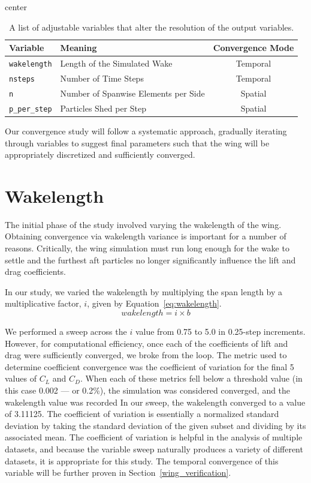 \documentclass{report}
\begin{document}
\begin{table}[H]
    \centering
    \caption{A list of adjustable variables that alter the resolution of the output variables.}\label{tab:adjustables}
    \begin{adjustbox}{center}
    \begin{tabular}{l l c}
        \toprule
        \textbf{Variable} & \textbf{Meaning} & \textbf{Convergence Mode} \\
        \midrule
        \texttt{wakelength} & Length of the Simulated Wake & Temporal \\
        \texttt{nsteps} & Number of Time Steps & Temporal \\
        \texttt{n} & Number of Spanwise Elements per Side & Spatial \\
        \texttt{p\_per\_step} & Particles Shed per Step & Spatial \\
        \bottomrule
    \end{tabular}
    \end{adjustbox}
\end{table}

Our convergence study will follow a systematic approach, gradually iterating through variables to suggest final parameters such that the wing will be appropriately discretized and sufficiently converged.

\section{Wakelength}
The initial phase of the study involved varying the wakelength of the wing. Obtaining convergence via wakelength variance is important for a number of reasons. Critically, the wing simulation must run long enough for the wake to settle and the furthest aft particles no longer significantly influence the lift and drag coefficients.

In our study, we varied the wakelength by multiplying the span length by a multiplicative factor, $i$, given by Equation~\ref{eq:wakelength}. 
\begin{equation}\label{eq:wakelength}
wakelength = i \times{} b
\end{equation}

We performed a sweep across the $i$ value from 0.75 to 5.0 in 0.25-step increments. However, for computational efficiency, once each of the coefficients of lift and drag were sufficiently converged, we broke from the loop.
The metric used to determine coefficient convergence was the coefficient of variation for the final 5 values of $C_L$ and $C_D$.
When each of these metrics fell below a threshold value (in this case 0.002 --- or 0.2\%), the simulation was considered converged, and the wakelength value was recorded
In our sweep, the wakelength converged to a value of 3.11125.
The coefficient of variation is essentially a normalized standard deviation by taking the standard deviation of the given subset and dividing by its associated mean. 
The coefficient of variation is helpful in the analysis of multiple datasets, and because the variable sweep naturally produces a variety of different datasets, it is appropriate for this study.
The temporal convergence of this variable will be further proven in Section~\ref{wing_verification}.
\end{document}
